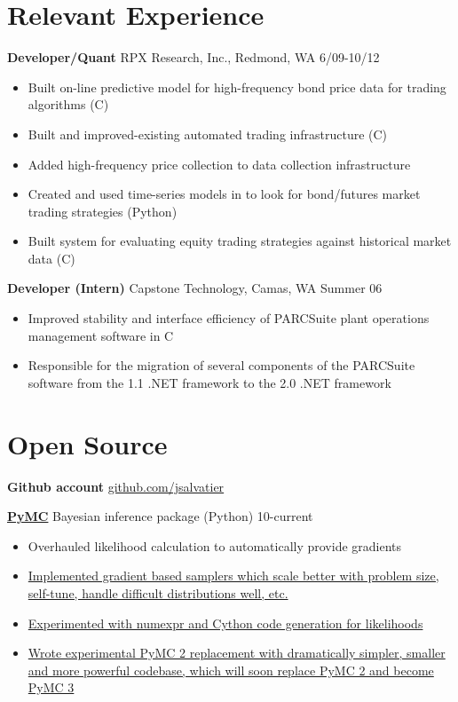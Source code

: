 \documentclass[margin]{res}
\newcommand{\bactivity}[3]{
  {\bf #1} #2 \hfill #3
    \vspace{6pt}
    \begin{itemize} \itemsep -2pt
      }
\newcommand{\eactivity}[0]{\end{itemize}}
\newcommand{\CS}
{C\nolinebreak[4]\hspace{-.05em}\raisebox{.22ex}{\footnotesize\bf \#}}
\begin{document}
 
 
\begin{resume} 
 

\section{Relevant Experience}
  \bactivity{Developer/Quant}{RPX Research, Inc., Redmond, WA}{6/09-10/12}
     \item Built on-line predictive model for high-frequency bond price data for trading algorithms (\CS)
     \item Built and improved-existing automated trading infrastructure (\CS)
     \item Added high-frequency price collection to data collection infrastructure
     \item Created and used time-series models in to look for bond/futures market trading strategies (Python) 
     \item Built system for evaluating equity trading strategies against historical market data (\CS) 
  \eactivity

    \bactivity{Developer (Intern)}{Capstone Technology, Camas, WA}{Summer 06}
    \item Improved stability and interface efficiency of PARCSuite plant operations management software in \CS\
    \item Responsible for the migration of several components of the PARCSuite software from the 1.1 .NET framework to the 2.0 .NET framework 
  \eactivity

 \section{Open Source}
 {\bf Github account} \href{https://github.com/jsalvatier}{github.com/jsalvatier}

    \bactivity{\href{https://github.com/pymc-devs/pymc\#readme}{PyMC}}{Bayesian inference package (Python)}{10-current}
      \item Overhauled likelihood calculation to automatically provide gradients 
      \item {\href{https://github.com/jsalvatier/gradient\_samplers/blob/master/gradient\_samplers}{Implemented gradient based samplers which scale better with problem size, self-tune, handle difficult distributions well, etc.}}
      \item {\href{https://github.com/pymc-devs/pymc/commits/numexpr\_dist}{Experimented with numexpr and Cython code generation for likelihoods}}
      \item {\href{https://github.com/pymc-devs/pymc/commits/pymc3}{Wrote experimental PyMC 2 replacement with dramatically simpler, smaller and more powerful codebase, which will soon replace PyMC 2 and become PyMC 3}}
    \eactivity


\end{resume}
\end{document}
